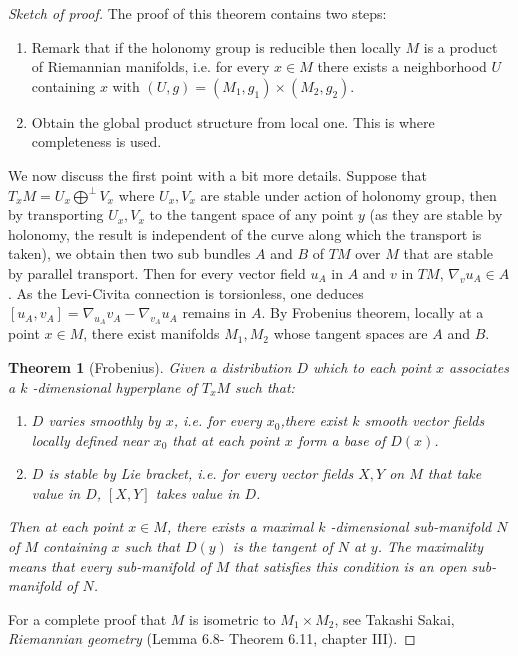\documentclass[11pt]{article}
\newtheorem{theorem}{Theorem}
\begin{document}
\begin{proof}[Sketch of proof]
The proof of this theorem contains two steps:
\begin{enumerate}
\item Remark that if the holonomy group is reducible then locally \(M\) is a product of Riemannian
manifolds, i.e. for every \(x\in M\) there exists a neighborhood \(U\) containing \(x\) with
\((U,g)=(M_1,g_1)\times (M_2,g_2)\).
\item Obtain the global product structure from local one. This is where completeness is used.
\end{enumerate}


We now discuss the first point with a bit more details. Suppose that \(T_xM = U_x \bigoplus^\perp
V_x\) where \(U_x, V_x\) are stable under action of holonomy group, then by transporting \(U_x, V_x\) to
the tangent space of any point \(y\) (as they are stable by holonomy, the result is independent of the
curve along which the transport is taken), we obtain then two sub bundles \(A\) and \(B\) of \(TM\) over
\(M\) that are stable by parallel transport. Then for every vector field \(u_A\) in \(A\) and \(v\) in \(TM\),
\(\nabla_v u_A \in A\). As the Levi-Civita connection is torsionless, one deduces \([u_A,v_A] =
\nabla_{u_A}v_A - \nabla_{v_A}u_A\) remains in \(A\). By Frobenius theorem, locally at a point \(x\in
M\), there exist manifolds \(M_1, M_2\) whose tangent spaces are \(A\) and \(B\).


\begin{theorem}[Frobenius]
\label{thm:Frobenius}
\label{org907de79}
Given a distribution \(D\) which to each point \(x\) associates a \(k\) -dimensional hyperplane of \(T_xM\)
such that:
\begin{enumerate}
\item \(D\) varies smoothly by \(x\), i.e. for every \(x_0\),there exist \(k\) smooth vector fields locally
defined near \(x_0\) that at each point \(x\) form a base of \(D(x)\).
\item \(D\) is stable by Lie bracket, i.e. for every vector fields \(X,Y\) on \(M\) that take value in \(D\),
\([X,Y]\) takes value in \(D\).
\end{enumerate}
Then at each point \(x\in M\), there exists a maximal \(k\) -dimensional sub-manifold \(N\) of \(M\) containing
\(x\) such that \(D(y)\) is the tangent of \(N\) at \(y\). The maximality means that every sub-manifold of
\(M\) that satisfies this condition is an open sub-manifold of \(N\).
\end{theorem}
For a complete proof that \(M\) is isometric to \(M_1\times M_2\), see Takashi Sakai, \emph{Riemannian
geometry} (Lemma 6.8- Theorem 6.11, chapter III).
\end{proof}
\end{document}

